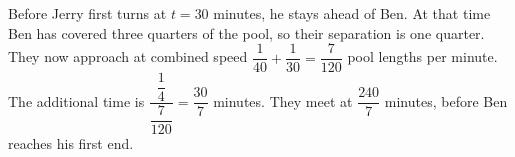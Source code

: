 Before Jerry first turns at $t=30$ minutes, he stays ahead of Ben. At that time Ben has covered three quarters of the pool, so their separation is one quarter. They now approach at combined speed $\dfrac{1}{40}+\dfrac{1}{30}=\dfrac{7}{120}$ pool lengths per minute. The additional time is $\dfrac{\dfrac{1}{4}}{\dfrac{7}{120}}=\dfrac{30}{7}$ minutes. They meet at $\boxed{\dfrac{240}{7}}$ minutes, before Ben reaches his first end.
